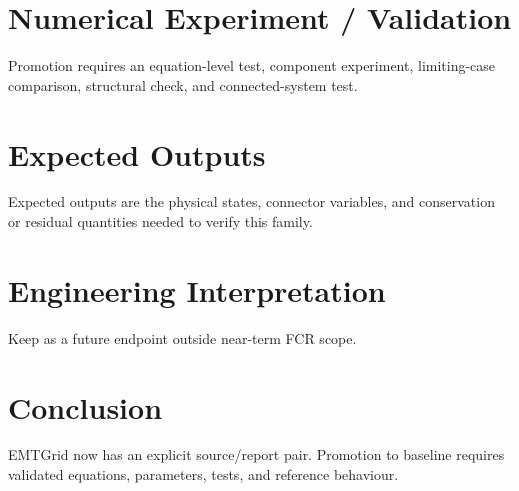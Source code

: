 \documentclass[10pt,a4paper]{article}
\begin{document}
\section{Numerical Experiment / Validation}Promotion requires an equation-level test, component experiment, limiting-case comparison, structural check, and connected-system test.
\section{Expected Outputs}Expected outputs are the physical states, connector variables, and conservation or residual quantities needed to verify this family.
\section{Engineering Interpretation}Keep as a future endpoint outside near-term FCR scope.
\section*{Conclusion}EMTGrid now has an explicit source/report pair. Promotion to baseline requires validated equations, parameters, tests, and reference behaviour.
\end{document}
